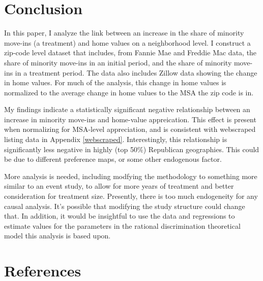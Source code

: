 \documentclass{article}
\begin{document}
\section{Conclusion}
In this paper, I analyze the link between an increase in the share of minority move-ins (a treatment) and home values on a neighborhood level. I construct a zip-code level dataset that includes, from Fannie Mae and Freddie Mac data, the share of minority move-ins in an initial period, and the share of minority move-ins in a treatment period. The data also includes Zillow data showing the change in home values. For much of the analysis, this change in home values is normalized to the average change in home values to the MSA the zip code is in. 

My findings indicate a statistically significant negative relationship between an increase in minority move-ins and home-value appreication. This effect is present when normalizing for MSA-level appreciation, and is consistent with webscraped listing data in Appendix \ref{webscraped}. Interestingly, this relationship is significantly less negative in highly (top 50\%) Republican geographies. This could be due to different preference maps, or some other endogenous factor.

More analysis is needed, including modfying the methodology to something more similar to an event study, to allow for more years of treatment and better consideration for treatment size. Presently, there is too much endogeneity for any causal analysis. It's possible that modifying the study structure could change that. In addition, it would be insightful to use the data and regressions to estimate values for the parameters in the rational discrimination theoretical model this analysis is based upon.
\section{References}
\end{document}

